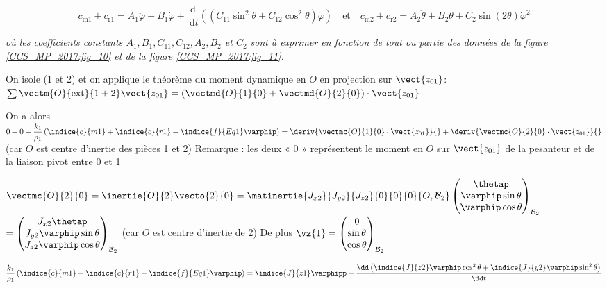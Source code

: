 $$ c_{\mathrm{m} 1}+c_{\mathrm{r} 1}=A_{1} \ddot{\varphi}+B_{1} \dot{\varphi}+\frac{\mathrm{d}}{\mathrm{~d} t}\left(\left(C_{11} \sin ^{2} \theta+C_{12} \cos ^{2} \theta\right) \dot{\varphi}\right) 
\quad \text{et} \quad
c_{\mathrm{m} 2}+c_{\mathrm{r} 2}=A_{2} \ddot{\theta}+B_{2} \dot{\theta}+C_{2} \sin (2 \theta) \dot{\varphi}^{2}$$

\textit{où les coefficients constants $A_{1}, B_{1}, C_{11}, C_{12}, A_{2}, B_{2}$ et $C_{2}$ sont à exprimer en fonction de tout ou partie des données de la figure \ref{CCS_MP_2017:fig_10} et de la figure \ref{CCS_MP_2017:fig_11}.}

\ifprof
\begin{corrige}
On isole (1 et 2) et on applique le théorème du moment dynamique en $O$ en projection sur $\vect{z_{01}}$:
$\sum \vectm{O}{\text{ext}}{1+2} \vect{z_{01}}  = \left(\vectmd{O}{1}{0} + \vectmd{O}{2}{0}\right)\cdot \vect{z_{01}}$

On a alors  
$0+0+\dfrac{k_1}{\rho_1} \left(\indice{c}{m1}+\indice{c}{r1}-\indice{f}{Eq1} \varphip \right)=
\deriv{\vectmc{O}{1}{0}\cdot \vect{z_{01}}}{} + \deriv{\vectmc{O}{2}{0}\cdot \vect{z_{01}}}{}$
(car $O$ est centre d’inertie des pièces 1 et 2) Remarque : les deux « 0 » représentent le moment en $O$ sur $\vect{z_{01}}$ de la pesanteur et de la liaison pivot entre 0 et 1

$\vectmc{O}{2}{0} = \inertie{O}{2} \vecto{2}{0} 
= \matinertie{J_{x2}}{J_{y2}}{J_{z2}}{0}{0}{0}{O,\mathcal{B}_2} \begin{pmatrix} \thetap \\ \varphip\sin\theta \\ \varphip \cos \theta \end{pmatrix}_{\mathcal{B}_2}$
$=\begin{pmatrix} J_{x2} \thetap \\ J_{y2}\varphip\sin\theta \\ J_{z2}\varphip \cos \theta \end{pmatrix}_{\mathcal{B}_2}$  (car $O$ est centre d’inertie de 2) De plus $\vz{1}=\begin{pmatrix} 0 \\ \sin\theta \\ \cos \theta \end{pmatrix}_{\mathcal{B}_2}$

$\dfrac{k_1}{\rho_1} \left(\indice{c}{m1}  +\indice{c}{r1}  -\indice{f}{Eq1} \varphip \right)=\indice{J}{z1} \varphipp+\dfrac{\dd \left(\indice{J}{z2} \varphip  \cos^2 \theta+\indice{J}{y2} \varphip \sin^2 \theta\right)}{\dd t}$
  

\end{corrige}
